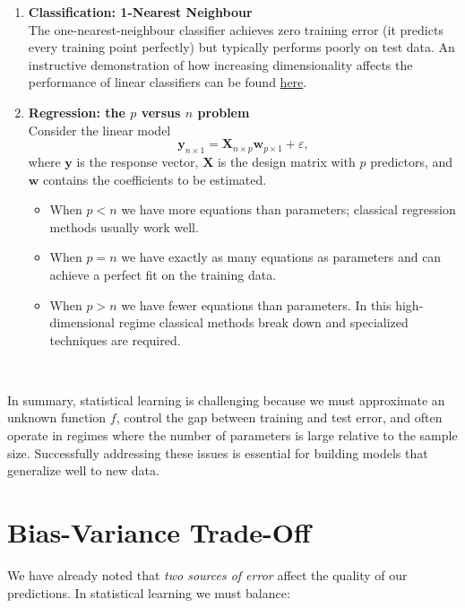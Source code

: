 \documentclass[
]{book}
\providecommand{\tightlist}{%
  \setlength{\itemsep}{0pt}\setlength{\parskip}{0pt}}
\begin{document}
\begin{enumerate}
\def\labelenumi{\arabic{enumi}.}
\item
  \textbf{Classification: 1-Nearest Neighbour}\\
  The one-nearest-neighbour classifier achieves zero training error (it predicts every training point perfectly) but typically performs poorly on test data. An instructive demonstration of how increasing dimensionality affects the performance of linear classifiers can be found \href{https://www.visiondummy.com/2014/04/curse-dimensionality-affect-classification/}{here}.
\item
  \textbf{Regression: the \(p\) versus \(n\) problem}\\
  Consider the linear model
  \[
  \mathbf{y}_{n\times 1} = \mathbf{X}_{n\times p}\mathbf{w}_{p\times 1} + \varepsilon,
  \]
  where \(\mathbf{y}\) is the response vector, \(\mathbf{X}\) is the design matrix with \(p\) predictors, and \(\mathbf{w}\) contains the coefficients to be estimated.

  \begin{itemize}
  \tightlist
  \item
    When \(p < n\) we have more equations than parameters; classical regression methods usually work well.
  \item
    When \(p = n\) we have exactly as many equations as parameters and can achieve a perfect fit on the training data.
  \item
    When \(p > n\) we have fewer equations than parameters. In this high-dimensional regime classical methods break down and specialized techniques are required.
  \end{itemize}
\end{enumerate}

~

In summary, statistical learning is challenging because we must approximate an unknown function \(f\), control the gap between training and test error, and often operate in regimes where the number of parameters is large relative to the sample size. Successfully addressing these issues is essential for building models that generalize well to new data.

\section{Bias-Variance Trade-Off}\label{bias-variance-trade-off}

We have already noted that \emph{two sources of error} affect the quality of our predictions. In statistical learning we must balance:
\end{document}

